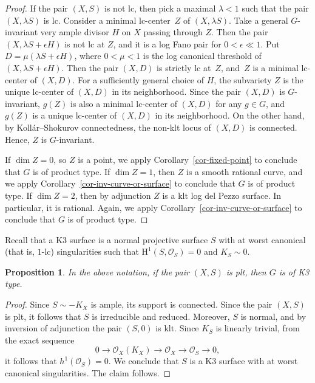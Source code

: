 \documentclass[11pt]{amsart}
\numberwithin{equation}{section}
\newtheorem{proposition}[thm]{Proposition}
\theoremstyle{definition}
\theoremstyle{remark}
\newcommand{\OOO}{\mathscr{O}}
\newcommand{\lra}{\longrightarrow}
\begin{document}
\begin{proof}
If the pair $(X, S)$ is not lc, then pick a maximal $\lambda<1$ such
that the pair $(X, \lambda S)$ is lc.
Consider a minimal lc-center~$Z$ of $(X, \lambda S)$.  
Take a general $G$-invariant very ample divisor $H$ on $X$ passing through $Z$. 
Then the pair $(X, \lambda S + \epsilon H)$ is not lc at $Z$, 
and it is a log Fano pair for $0<\epsilon\ll 1$. 
Put $D=\mu(\lambda S + \epsilon H)$, where $0<\mu<1$ is the log canonical threshold of $(X, \lambda S + \epsilon H)$. 
Then the pair $(X, D)$ is strictly lc at~$Z$, and~$Z$ is a minimal lc-center of $(X, D)$.
For a sufficiently general choice of $H$, the subvariety $Z$ is the unique lc-center of $(X,D)$ in its neighborhood.
Since the pair $(X, D)$ is $G$-invariant, $g(Z)$ is also a minimal lc-center of $(X, D)$ for any $g\in G$, and  $g(Z)$  is a unique lc-center of $(X, D)$ in its neighborhood.
On the other hand, by Koll\'ar--Shokurov connectedness, the non-klt locus of $(X, D)$ is connected. Hence, $Z$ is $G$-invariant. 

If $\dim Z = 0$, so $Z$ is a point, we apply Corollary~\ref{cor-fixed-point} to conclude that $G$ is of product type. 
If $\dim Z=1$, then $Z$ is a smooth rational curve, and we apply Corollary~\ref{cor-inv-curve-or-surface} to conclude that $G$ is of product type. 
If $\dim Z=2$, then by adjunction $Z$ is a klt log del Pezzo surface. In particular, it is rational. 
Again, we apply Corollary~\ref{cor-inv-curve-or-surface} to conclude that $G$ is of product type. 
\end{proof}

Recall that a K3 surface is a normal projective surface
$S$ with at worst canonical (that is, $1$-lc) singularities such that
$\mathrm{H}^1(S, \OOO_S)=0$ and $K_S\sim 0$. 

\begin{proposition}
\label{the-pair-is-plt}
In the above notation,
if the pair $(X, S)$ is plt, then $G$ is of K3 type.
\end{proposition}

\begin{proof}
Since $S\sim -K_X$ is ample, its support is connected. Since the pair $(X, S)$ is plt, it follows that $S$ is irreducible and reduced.  Moreover, $S$ is normal, and by inversion of adjunction the pair $(S, 0)$ is klt. Since $K_S$ is linearly trivial, from the exact sequence
\[
0 \lra \OOO_X(K_X) \lra \OOO_X \lra \OOO_S \lra 0, 
\]
it follows that $h^1(\OOO_S) = 0$. 
We conclude that $S$ is a K3 surface with at worst canonical singularities. The claim follows.
\end{proof}
\end{document}
